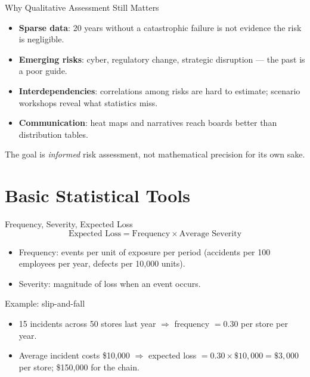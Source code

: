 \documentclass[11pt, aspectratio=169]{beamer}
\begin{document}
\begin{frame}{Why Qualitative Assessment Still Matters}
\begin{itemize}
  \item \textbf{Sparse data}: 20 years without a catastrophic failure is not evidence the risk is negligible.
  \item \textbf{Emerging risks}: cyber, regulatory change, strategic disruption --- the past is a poor guide.
  \item \textbf{Interdependencies}: correlations among risks are hard to estimate; scenario workshops reveal what statistics miss.
  \item \textbf{Communication}: heat maps and narratives reach boards better than distribution tables.
\end{itemize}
\medskip
The goal is \emph{informed} risk assessment, not mathematical precision for its own sake.
\end{frame}

\section{Basic Statistical Tools}

\begin{frame}{Frequency, Severity, Expected Loss}
\[
\text{Expected Loss} = \text{Frequency} \times \text{Average Severity}
\]
\begin{itemize}
  \item \alert{Frequency}: events per unit of exposure per period (accidents per 100 employees per year, defects per 10{,}000 units).
  \item \alert{Severity}: magnitude of loss when an event occurs.
\end{itemize}
\medskip
\begin{exampleblock}{Example: slip-and-fall}
\begin{itemize}
  \item 15 incidents across 50 stores last year $\Rightarrow$ frequency $= 0.30$ per store per year.
  \item Average incident costs \$10{,}000 $\Rightarrow$ expected loss $= 0.30 \times \$10{,}000 = \$3{,}000$ per store; \$150{,}000 for the chain.
\end{itemize}
\end{exampleblock}
\end{frame}
\end{document}
